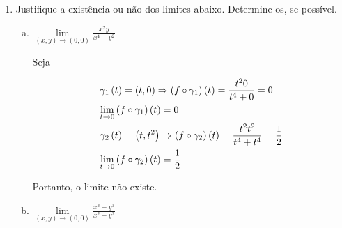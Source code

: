 \documentclass[11pt, oneside, a4paper]{gsm-l}
\begin{document}
\begin{enumerate}
\begin{sol}
\begin{enumerate}[(a)]
Implica que, $\exists c \in \left] {a,b} \right[$ tal que $g'\left( c \right) = 0$. Então,

\[
\begin{gathered}
0 = g'\left( c \right) = f'\left( c \right) - d \hfill \\
\Rightarrow f'\left( c \right) = d \hfill \\
\end{gathered}
\]

Ainda, $f'$ crescente, implica que, $f'$ é contínua.

\end{enumerate}

\end{sol}

\newpage 

\textbf{Grupo 2: Cálculo em várias variáveis reais.}

  \item Justifique a exist\^encia ou não dos limites abaixo. Determine-os, se possível.

\begin{enumerate}[(a)]
\item $\mathop {\lim }\limits_{\left( {x,y} \right) \to \left( {0,0} \right)} \displaystyle \frac{{x^2 y}}{{x^4  + y^2 }}$

\begin{sol}
Seja

\[
\begin{gathered}
  \gamma _1 \left( t \right) = \left( {t,0} \right) \Rightarrow \left( {f \circ \gamma _1 } \right)\left( t \right) = \frac{{t^2 0}}
{{t^4  + 0}} = 0 \hfill \\
  \mathop {\lim }\limits_{t \to 0} \left( {f \circ \gamma _1 } \right)\left( t \right) = 0 \hfill \\
  \gamma _2 \left( t \right) = \left( {t,t^2 } \right) \Rightarrow \left( {f \circ \gamma _2 } \right)\left( t \right) = \frac{{t^2 t^2 }}
{{t^4  + t^4 }} = \frac{1}
{2} \hfill \\
  \mathop {\lim }\limits_{t \to 0} \left( {f \circ \gamma _2 } \right)\left( t \right) = \frac{1}
{2} \hfill \\
\end{gathered}
\]

Portanto, o limite não existe.
\end{sol}

\item $\mathop {\lim }\limits_{\left( {x,y} \right) \to \left( {0,0} \right)} \displaystyle \frac{{x^3 + y^3}}{{x^2  + y^2 }}$


\end{enumerate}
\end{enumerate}
\end{document}

